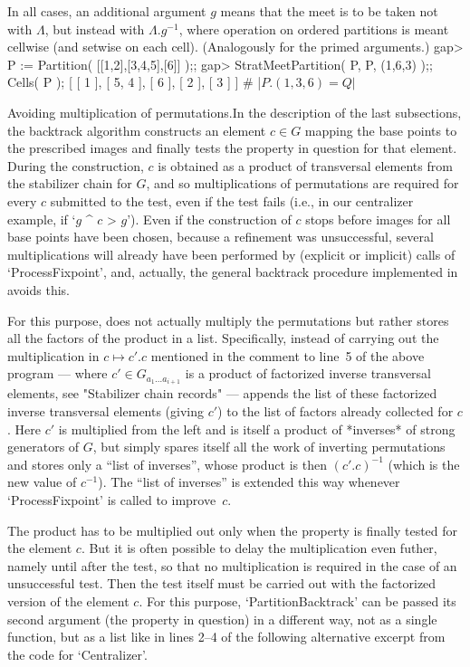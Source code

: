 In  all cases, an additional  argument $g$ means that the   meet is to be
taken  not with $\Lambda$,   but  instead with $\Lambda.{g^{-1}}$,  where
operation  on ordered partitions is  meant cellwise  (and setwise on each
cell). (Analogously for the primed arguments.)
\beginexample
    gap> P := Partition( [[1,2],[3,4,5],[6]] );;
    gap> StratMeetPartition( P, P, (1,6,3) );;  Cells( P );
    [ [ 1 ], [ 5, 4 ], [ 6 ], [ 2 ], [ 3 ] ]  # |$P.(1,3,6) = Q|$
\endexample

\medskip
{\bsf Avoiding multiplication  of permutations.}\quad In the  description
of  the last subsections, the  backtrack  algorithm constructs an element
$c\in G$ mapping  the base points   to the prescribed images  and finally
tests the property in question for that element. During the construction,
$c$ is obtained as a product  of transversal elements from the stabilizer
chain for $G$,  and so multiplications  of permutations are required  for
every $c$  submitted to the test,  even if the  test fails (i.e.,  in our
centralizer example, if `$g$ ^ $c$ \<> $g$'). Even if the construction of
$c$ stops before images  for all base  points have been chosen, because a
refinement was unsuccessful,  several  multiplications will  already have
been performed by (explicit or implicit) calls of `ProcessFixpoint', and,
actually, the general   backtrack procedure implemented in  {\GAP} avoids
this.

For this purpose, {\GAP} does  not actually multiply the permutations but
rather stores  all the factors of the   product in a  list. Specifically,
instead of carrying out  the multiplication in $c\mapsto c'.c$  mentioned
in  the   comment  to  line~5 of  the   above  program   --- where $c'\in
G_{a_1\ldots  a_{i+1}}$ is a  product  of factorized inverse  transversal
elements, see "Stabilizer  chain records" ---  {\GAP} appends the list of
these factorized inverse  transversal elements (giving  $c'$) to the list
of factors already  collected for $c$. Here $c'$  is multiplied from  the
left and is itself a  product of *inverses*  of strong generators of $G$,
but {\GAP} simply spares itself   all the work of inverting  permutations
and stores  only  a    ``list  of  inverses'',  whose product    is  then
$(c'.c)^{-1}$  (which is  the  new  value of  $c^{-1}$).  The ``list   of
inverses'' is  extended this way  whenever `ProcessFixpoint' is called to
improve~$c$.

The  product has to be multiplied  out only when  the property is finally
tested  for  the  element $c$. But  it  is  often possible  to  delay the
multiplication  even  futher, namely  until after   the test, so  that no
multiplication is required in the case of  an unsuccessful test. Then the
test  itself  must be carried   out with the  factorized   version of the
element $c$.  For  this purpose,  `PartitionBacktrack' can  be passed its
second argument (the property  in question) in  a different way, not as a
single {\GAP} function, but as a list like in lines 2--4 of the following
alternative excerpt from the code for `Centralizer'.

